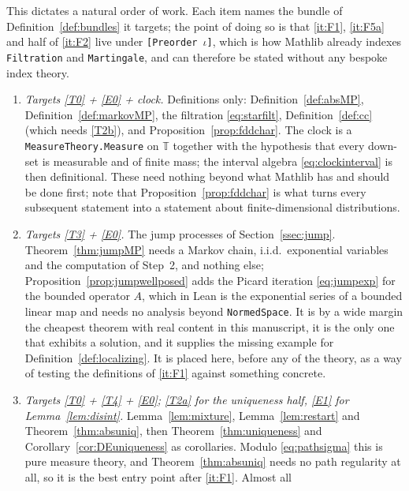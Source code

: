 \documentclass[11pt,a4paper]{article}
\theoremstyle{plain}
\theoremstyle{definition}
\theoremstyle{remark}
\newcommand{\T}{\mathbb{T}}                     %
\begin{document}
This dictates a natural order of work.  Each item names the bundle of
Definition~\ref{def:bundles} it targets; the point of doing so is that
\ref{it:F1}, \ref{it:F5a} and half of \ref{it:F2} live under
\texttt{[Preorder \(\iota\)]}, which is how Mathlib already indexes
\texttt{Filtration} and \texttt{Martingale}, and can therefore be stated without
any bespoke index theory.

\begin{enumerate}[label=\textbf{(F\arabic*)}]
\item \label{it:F1}
  \emph{Targets \eqref{T0} + \eqref{E0} + clock.}
  Definitions only: Definition~\ref{def:absMP}, Definition~\ref{def:markovMP},
  the filtration \eqref{eq:starfilt}, Definition~\ref{def:cc} (which needs
  \eqref{T2b}), and Proposition~\ref{prop:fddchar}.  The clock is a
  \texttt{MeasureTheory.Measure} on $\T$ together with the hypothesis that every
  down-set is measurable and of finite mass; the interval algebra
  \eqref{eq:clockinterval} is then definitional.  These need nothing beyond what Mathlib has and
  should be done first; note that Proposition~\ref{prop:fddchar} is what turns
  every subsequent statement into a statement about finite-dimensional
  distributions.
\item \label{it:F0}
  \emph{Targets \eqref{T3} + \eqref{E0}.}  The jump processes of Section~\ref{ssec:jump}.  Theorem~\ref{thm:jumpMP} needs a Markov chain,
  i.i.d.\ exponential variables and the computation of Step~2, and nothing else;
  Proposition~\ref{prop:jumpwellposed} adds the Picard iteration
  \eqref{eq:jumpexp} for the bounded operator $A$, which in Lean is the
  exponential series of a bounded linear map and needs no analysis beyond
  \texttt{NormedSpace}.  It is by a wide margin the cheapest theorem with real
  content in this manuscript, it is the only one that exhibits a solution, and it
  supplies the missing example for Definition~\ref{def:localizing}.  It is placed
  here, before any of the theory, as a way of testing the definitions of
  \ref{it:F1} against something concrete.
\item \label{it:F2}
  \emph{Targets \eqref{T0} + \eqref{T4} + \eqref{E0}; \eqref{T2a} for the uniqueness half, \eqref{E1} for
  Lemma~\ref{lem:disint}.}
  Lemma~\ref{lem:mixture}, Lemma~\ref{lem:restart} and
  Theorem~\ref{thm:absuniq}, then Theorem~\ref{thm:uniqueness} and
  Corollary~\ref{cor:DEuniqueness} as corollaries.  Modulo \eqref{eq:pathsigma}
  this is pure measure theory, and Theorem~\ref{thm:absuniq} needs no path
  regularity at all, so it is the best entry point after \ref{it:F1}.  Almost all

\end{enumerate}
\end{document}
